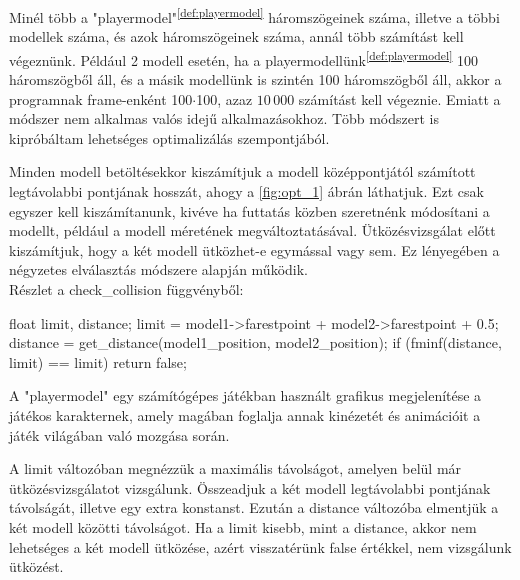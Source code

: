 
Minél több a "playermodel"\textsuperscript{\ref{def:playermodel}} háromszögeinek száma, illetve a többi modellek száma, és azok háromszögeinek száma, annál több számítást kell végeznünk. Például 2 modell esetén, ha a playermodellünk\textsuperscript{\ref{def:playermodel}} 100 háromszögből áll, és a másik modellünk is szintén 100 háromszögből áll, akkor a programnak frame-enként 100$\cdot$100, azaz $10\,000$ számítást kell végeznie. Emiatt a módszer nem alkalmas valós idejű alkalmazásokhoz. Több módszert is kipróbáltam lehetséges optimalizálás szempontjából.

Minden modell betöltésekkor kiszámítjuk a modell középpontjától számított legtávolabbi pontjának hosszát, ahogy a \ref{fig:opt_1} ábrán láthatjuk. Ezt csak egyszer kell kiszámítanunk, kivéve ha futtatás közben szeretnénk módosítani a modellt, például a modell méretének megváltoztatásával. Ütközésvizsgálat előtt kiszámítjuk, hogy a két modell ütközhet-e egymással vagy sem. Ez lényegében a négyzetes elválasztás módszere alapján működik.
\\
Részlet a check\_collision függvényből:
\begin{cpp}
float limit, distance;
limit = model1->farestpoint + model2->farestpoint + 0.5;
distance = get_distance(model1_position, model2_position);
if (fminf(distance, limit) == limit)
{
    return false;
}
\end{cpp}

\vfill
\begin{definition}[Playermodel]
	A "playermodel" egy számítógépes játékban használt grafikus megjelenítése a játékos karakternek, amely magában foglalja annak kinézetét és animációit a játék világában való mozgása során.
	\label{def:playermodel}
\end{definition}
\newpage
A limit változóban megnézzük a maximális távolságot, amelyen belül már ütközésvizsgálatot vizsgálunk. Összeadjuk a két modell legtávolabbi pontjának távolságát, illetve egy extra konstanst. Ezután a distance változóba elmentjük a két modell közötti távolságot. Ha a limit kisebb, mint a distance, akkor nem lehetséges a két modell ütközése, azért visszatérünk false értékkel, nem vizsgálunk ütközést.

